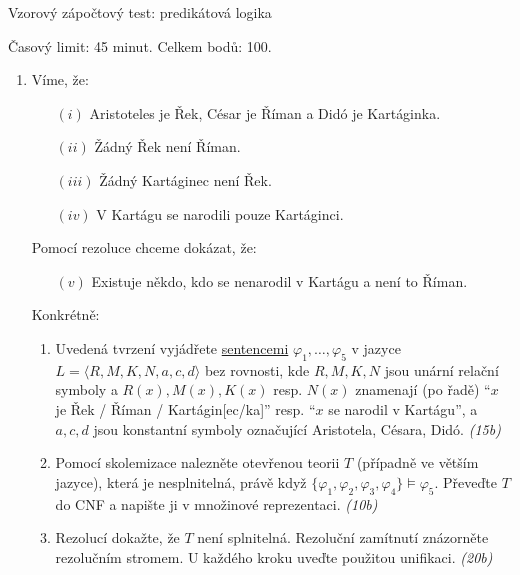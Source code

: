\documentclass[a4paper]{article}
\begin{document}
\thispagestyle{empty}

\begin{center}
    \large{Vzorový zápočtový test: predikátová logika}    
\end{center}

Časový limit: 45 minut. Celkem bodů: 100.

\bigskip

\begin{enumerate}

\item Víme, že:
\begin{enumerate}
    \item[$(i)$] Aristoteles je Řek, César je Říman a Didó je Kartáginka.
    \item[$(ii)$] Žádný Řek není Říman.
    \item[$(iii)$] Žádný Kartáginec není Řek.
    \item[$(iv)$] V Kartágu se narodili pouze Kartáginci.
\end{enumerate}
    
Pomocí rezoluce chceme dokázat, že:
    
\begin{enumerate}
    \item[$(v)$] Existuje někdo, kdo se nenarodil v Kartágu a není to Říman.
\end{enumerate}
    
Konkrétně:
\begin{enumerate}
\item Uvedená tvrzení vyjádřete \underline{sentencemi} $\varphi_1, \dots, \varphi_5$ v jazyce $L=\langle R, M, K, N, a, c, d \rangle$ bez rovnosti, kde $R, M, K, N$ jsou unární relační symboly a $R(x), M(x), K(x)$ resp. $N(x)$ znamenají (po řadě) ``$x$ je Řek / Říman / Kartágin[ec/ka]'' resp. ``$x$ se narodil v Kartágu'', a $a, c, d$ jsou konstantní symboly označující Aristotela, Césara, Didó. {\it (15b)}
    \item Pomocí skolemizace nalezněte otevřenou teorii $T$ (případně ve větším jazyce), která je nesplnitelná, právě když  $\{\varphi_1, \varphi_2, \varphi_3, \varphi_4\} \models \varphi_5$. Převeďte $T$ do CNF a napište ji v množinové reprezentaci. {\it (10b)}
    \item Rezolucí dokažte, že $T$ není splnitelná. Rezoluční zamítnutí znázorněte rezolučním stromem. U každého kroku uveďte použitou unifikaci. {\it (20b)}
    \end{enumerate}


\end{enumerate}
\end{document}

